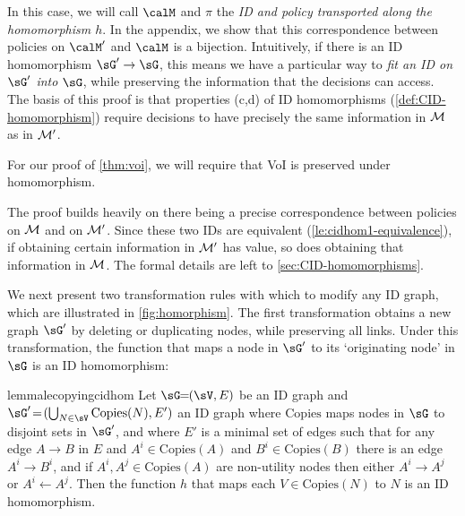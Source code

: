 In this case, we will call $\calM$ and $\pi$ the \emph{ID and policy transported along the homomorphism $h$}. In the appendix, we show that this correspondence between policies on $\calM'$ and $\calM$ is a bijection.
Intuitively, if there is an ID homomorphism $\sG'\to \sG$, this means we have a particular way to \textit{fit an ID on $\sG'$ into $\sG$}, while preserving the information that the decisions can access.
The basis of this proof is that properties (c,d) of ID homomorphisms (\cref{def:CID-homomorphism}) require decisions to have precisely the same information in $\cal M$ as in $\cal M'$.~





For our proof of \cref{thm:voi}, we will require that VoI is preserved under homomorphism.




The proof builds heavily on there being a precise correspondence between policies on $\cal M$ and on $\cal M'$. Since these two IDs are equivalent (\cref{le:cidhom1-equivalence}), if obtaining certain information in $\cal M'$ has value, so does obtaining that information in $\cal M$. The formal details are left to \cref{sec:CID-homomorphisms}.~



We next present two transformation rules with which to modify any ID graph, which are illustrated in \cref{fig:homorphism}.
The first transformation obtains a new graph $\sG'$ by deleting or duplicating nodes, while preserving all links. Under this transformation, the function that maps a node in $\sG'$ to its `originating node' in $\sG$ is an ID homomorphism:
~





\newcommand{\sCopies}{\mathrm{Copies}}
\begin{restatable}{lemma}{lecopyingcidhom} \label{le:21may19.2-CID-hom-from-node-copying-and-deleting}
Let $\sG\!\!=\!\!(\sV, E)$ be an ID graph and $\sG'\!=\!(\bigcup_{N\in\sV}\sCopies(N),E')$ an ID graph where $\sCopies$ maps nodes in $\sG$ to disjoint sets in $\sG'$, and where $E'$ is a minimal set of edges such that 
for any edge $A \to B$ in $E$ and $A^i\in \sCopies(A)$ and $B^i\in \sCopies(B)$ there is an edge $A^i\to B^i$,
and if  $A^i,A^j\in \sCopies(A)$ are non-utility nodes then 
either
$A^i\to A^j$ or $A^i\gets A^j$. Then the function $h$ that maps each $V\in \sCopies(N)$ to $N$ is an ID homomorphism.~

\end{restatable}

